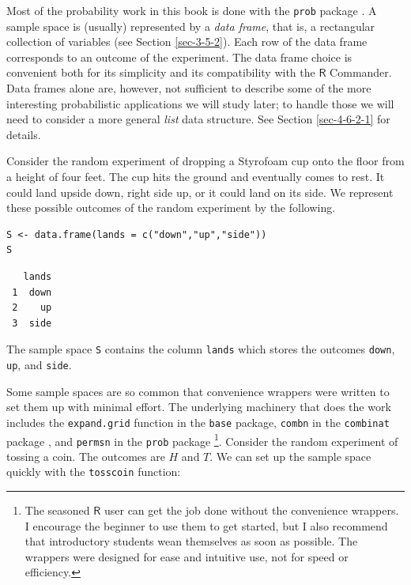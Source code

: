 \documentclass[captions=tableheading]{scrbook}
\begin{document}
Most of the probability work in this book is done with the \texttt{prob} package \cite{Kernsprob}. A sample space is (usually) represented by a \emph{data frame}, that is, a rectangular collection of variables (see Section \ref{sec-3-5-2}). Each row of the data frame corresponds to an outcome of the experiment. The data frame choice is convenient both for its simplicity and its compatibility with the \(\mathsf{R}\) Commander. Data frames alone are, however, not sufficient to describe some of the more interesting probabilistic applications we will study later; to handle those we will need to consider a more general \emph{list} data structure. See Section \ref{sec-4-6-2-1} for details.

\begin{example}
Consider the random experiment of dropping a Styrofoam cup onto the floor from a height of four feet. The cup hits the ground and eventually comes to rest. It could land upside down, right side up, or it could land on its side. We represent these possible outcomes of the random experiment by the following.


\begin{verbatim}
S <- data.frame(lands = c("down","up","side"))
S
\end{verbatim}

\begin{verbatim}
   lands
 1  down
 2    up
 3  side
\end{verbatim}

The sample space \texttt{S} contains the column \texttt{lands} which stores the outcomes \texttt{down}, \texttt{up}, and \texttt{side}. 

\end{example}

Some sample spaces are so common that convenience wrappers were written to set them up with minimal effort. The underlying machinery that does the work includes the \texttt{expand.grid} function in the \texttt{base} package, \texttt{combn} in the \texttt{combinat} package \cite{combinat}, and \texttt{permsn} in the \texttt{prob} package
\footnote{The seasoned \(\mathsf{R}\) user can get the job done without the convenience wrappers. I encourage the beginner to use them to get started, but I also recommend that introductory students wean themselves as soon as possible. The wrappers were designed for ease and intuitive use, not for speed or efficiency.}.
Consider the random experiment of tossing a coin. The outcomes are \(H\) and \(T\). We can set up the sample space quickly with the \texttt{tosscoin} function:
\end{document}
